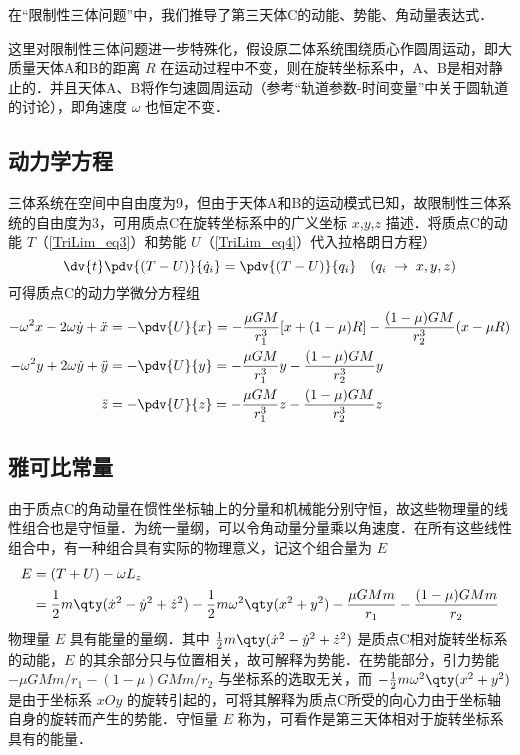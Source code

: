 

在“限制性三体问题”中，我们推导了第三天体C的动能、势能、角动量表达式．

这里对限制性三体问题进一步特殊化，假设原二体系统围绕质心作圆周运动，即大质量天体A和B的距离 $R$ 在运动过程中不变，则在旋转坐标系中，A、B是相对静止的．并且天体A、B将作匀速圆周运动（参考“轨道参数-时间变量”中关于圆轨道的讨论），即角速度 $\omega$ 也恒定不变．


\subsection{动力学方程}
三体系统在空间中自由度为9，但由于天体A和B的运动模式已知，故限制性三体系统的自由度为3，可用质点C在旋转坐标系中的广义坐标 $x$,$y$,$z$ 描述．将质点C的动能 $T$（\autoref{TriLim_eq3}）和势能 $U$（\autoref{TriLim_eq4}）代入拉格朗日方程）
\begin{equation}%
\dv{t} \pdv{(T-U)}{\dot q_i} = \pdv{(T-U)}{q_i}
\quad (q_i\; \rightarrow \; x,y,z)
\end{equation}
可得质点C的动力学微分方程组
\begin{align}
-\omega^2 x - 2\omega\dot{y} + \ddot{x} &=- \pdv{U}{x}=-\frac{\mu GM}{r_1^3}[x+(1-\mu)R]-\frac{(1-\mu)GM}{r_2^3}(x-\mu R)\label{JConst_eq2}\\%
-\omega^2 y +2\omega\dot{y} + \ddot{y} &=- \pdv{U}{y}=-\frac{\mu GM}{r_1^3}y-\frac{(1-\mu)GM}{r_2^3}y\label{JConst_eq3}\\%
\ddot{z} &=- \pdv{U}{z} =-\frac{\mu GM}{r_1^3}z-\frac{(1-\mu)GM}{r_2^3}z\label{JConst_eq4}%
\end{align}

\subsection{雅可比常量}
由于质点C的角动量在惯性坐标轴上的分量和机械能分别守恒，故这些物理量的线性组合也是守恒量．为统一量纲，可以令角动量分量乘以角速度．在所有这些线性组合中，有一种组合具有实际的物理意义，记这个组合量为 $E$ 
\begin{equation}%
\begin{aligned}
E &=(T+U)-\omega L_z\\
&=\frac{1}{2}m\qty(\dot{x}^2-\dot{y}^2+\dot{z}^2)-\frac{1}{2}m\omega^2\qty(x^2+y^2)-\frac{\mu GMm}{r_1}-\frac{(1-\mu)GMm}{r_2}
\end{aligned}
\end{equation}
物理量 $E$ 具有能量的量纲．其中 $\frac{1}{2}m\qty(\dot{x}^2-\dot{y}^2+\dot{z}^2)$ 是质点C相对旋转坐标系的动能，$E$ 的其余部分只与位置相关，故可解释为势能．在势能部分，引力势能 $-\mu GMm/r_1-(1-\mu)GMm/r_2$ 与坐标系的选取无关，而 $-\frac{1}{2}m\omega^2\qty(x^2+y^2)$ 是由于坐标系 $xOy$ 的旋转引起的，可将其解释为质点C所受的向心力由于坐标轴自身的旋转而产生的势能．守恒量 $E$ 称为，可看作是第三天体相对于旋转坐标系具有的能量．

